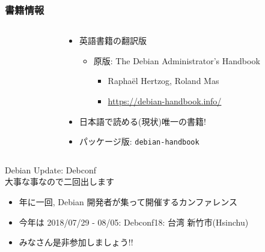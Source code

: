 \documentclass[cjk,c,squeeze,shrink,dvipdfmx,12pt]{beamer}
\begin{document}
\begin{frame}
  \frametitle{書籍情報}
  \begin{columns}
    \begin{column}{.45\paperwidth}
      \centering
    \end{column}
    \begin{column}{.54\paperwidth}
      \begin{itemize}
      \item %
        英語書籍の翻訳版
        \begin{itemize}
        \item %
          原版: The Debian Administrator's Handbook
          \begin{itemize}
          \item %
            Rapha\"el Hertzog, Roland Mas
          \item \url{https://debian-handbook.info/}
          \end{itemize}
        \end{itemize}
      \item %
        日本語で読める(現状)唯一の書籍!
      \item %
        パッケージ版:
        \texttt{debian-handbook}
      \end{itemize}
    \end{column}
  \end{columns}
\end{frame}


\begin{frame}[fragile]{Debian Update: Debconf%
  \\大事な事なので二回出します}%
  \begin{itemize}
  \item 年に一回, Debian 開発者が集って開催するカンファレンス
  \item 今年は
    \alert{2018/07/29 - 08/05: Debconf18: 台湾 新竹市(Hsinchu)}
  \end{itemize}
  \begin{center}
  \end{center}
  \begin{itemize}
  \item \alert{みなさん是非参加しましょう!!}
  \end{itemize}
\end{frame}


\end{document}
